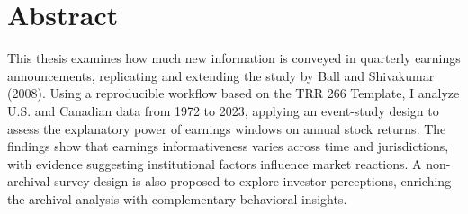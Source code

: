 \clearpage
{}
\setcounter{page}{3}  %
\section*{Abstract}

This thesis examines how much new information is conveyed in quarterly earnings announcements, replicating and extending the study by Ball and Shivakumar (2008). Using a reproducible workflow based on the TRR 266 Template, I analyze U.S. and Canadian data from 1972 to 2023, applying an event-study design to assess the explanatory power of earnings windows on annual stock returns. The findings show that earnings informativeness varies across time and jurisdictions, with evidence suggesting institutional factors influence market reactions. A non-archival survey design is also proposed to explore investor perceptions, enriching the archival analysis with complementary behavioral insights.

\clearpage